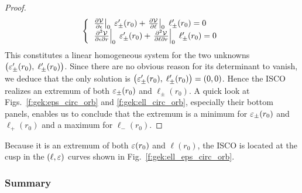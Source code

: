 \begin{proof}
\[
    \left\{\begin{array}{l}
       \left. \frac{\partial \mathcal{V}}{\partial \epsilon} \right| _0 \;  \varepsilon_\pm'(r_0)
    + \left. \frac{\partial \mathcal{V}}{\partial \ell} \right| _0 \;  \ell_\pm'(r_0) = 0 \\
    \left. \frac{\partial^2\mathcal{V}}{\partial\epsilon\partial r} \right| _0 \;  \varepsilon_\pm'(r_0)
    + \left. \frac{\partial^2\mathcal{V}}{\partial\ell\partial r} \right| _0 \;  \ell_\pm'(r_0) = 0
    \end{array} \right.
\]
This constitutes a linear homogeneous system for the two
unknowns $\left(\varepsilon_\pm'(r_0),\; \ell_\pm'(r_0)\right)$.
Since there are no obvious reason for its determinant to vanish, we deduce that
the only solution is $\left(\varepsilon_\pm'(r_0),\; \ell_\pm'(r_0)\right) = (0, 0)$.
Hence the ISCO realizes an extremum of both $\varepsilon_\pm(r_0)$ and $\ell_\pm(r_0)$.
A quick look at Figs.~\ref{f:gek:eps_circ_orb} and \ref{f:gek:ell_circ_orb},
especially their bottom panels, enables us to conclude that the extremum is
a minimum for $\varepsilon_\pm(r_0)$ and $\ell_+(r_0)$ and a maximum for $\ell_-(r_0)$.
\end{proof}

Because it is an extremum of both $\varepsilon(r_0)$ and $\ell(r_0)$,
the ISCO is located at the cusp in the
$(\ell,\varepsilon)$ curves shown in Fig.~\ref{f:gek:ell_eps_circ_orb}.

\subsubsection{Summary}

